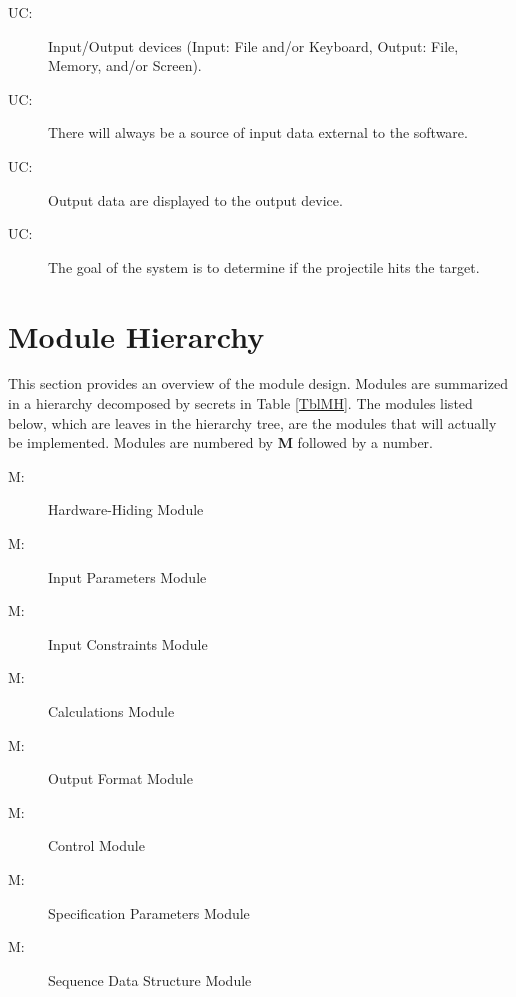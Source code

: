 \documentclass[12pt]{article}
\newcounter{ucnum}
\newcommand{\uctheucnum}{UC\theucnum}
\newcounter{mnum}
\newcommand{\mthemnum}{M\themnum}
\begin{document}
\begin{description}
\item[ \uctheucnum \label{ucIO}:] Input/Output devices
  (Input: File and/or Keyboard, Output: File, Memory, and/or Screen).
\item[ \uctheucnum \label{ucInput}:] There will always be
  a source of input data external to the software.
\item[ \uctheucnum \label{ucOutput}:] Output data are
  displayed to the output device.
\item[ \uctheucnum \label{ucGoal}:] The goal of the system
  is to determine if the projectile hits the target.
\end{description}

\section{Module Hierarchy} \label{SecMH}

This section provides an overview of the module design. Modules are summarized
in a hierarchy decomposed by secrets in Table \ref{TblMH}. The modules listed
below, which are leaves in the hierarchy tree, are the modules that will
actually be implemented. Modules are numbered by \textbf{M}
followed by a number. 

\begin{description}
\item [ \mthemnum \label{mHH}:] Hardware-Hiding Module
\item [ \mthemnum \label{mParams}:] Input Parameters Module
\item [ \mthemnum \label{mInCons}:] Input Constraints Module
\item [ \mthemnum \label{mCalc}:] Calculations Module
\item [ \mthemnum \label{mOutput}:] Output Format Module
\item [ \mthemnum \label{mControl}:] Control Module
\item [ \mthemnum \label{mSpecParams}:] Specification Parameters Module
\item [ \mthemnum \label{mSeqDS}:] Sequence Data Structure Module
\end{description}
\end{document}
